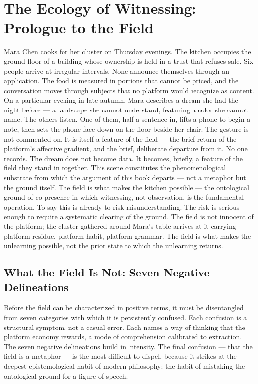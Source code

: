 \chapter{The Ecology of Witnessing: Prologue to the Field}
\label{ch:01}



Mara Chen cooks for her cluster on Thursday evenings. The kitchen occupies the ground floor of a building whose ownership is held in a trust that refuses sale. Six people arrive at irregular intervals. None announce themselves through an application. The food is measured in portions that cannot be priced, and the conversation moves through subjects that no platform would recognize as content. On a particular evening in late autumn, Mara describes a dream she had the night before --- a landscape she cannot understand, featuring a color she cannot name. The others listen. One of them, half a sentence in, lifts a phone to begin a note, then sets the phone face down on the floor beside her chair. The gesture is not commented on. It is itself a feature of the field --- the brief return of the platform's affective gradient, and the brief, deliberate departure from it. No one records. The dream does not become data. It becomes, briefly, a feature of the field they stand in together. This scene constitutes the phenomenological substrate from which the argument of this book departs --- not a metaphor but the ground itself. The field is what makes the kitchen possible --- the ontological ground of co-presence in which witnessing, not observation, is the fundamental operation. To say this is already to risk misunderstanding. The risk is serious enough to require a systematic clearing of the ground. The field is not innocent of the platform; the cluster gathered around Mara's table arrives at it carrying platform-residue, platform-habit, platform-grammar. The field is what makes the unlearning possible, not the prior state to which the unlearning returns.

\section{What the Field Is Not: Seven Negative Delineations}

Before the field can be characterized in positive terms, it must be disentangled from seven categories with which it is persistently confused. Each confusion is a structural symptom, not a casual error. Each names a way of thinking that the platform economy rewards, a mode of comprehension calibrated to extraction. The seven negative delineations build in intensity. The final confusion --- that the field is a metaphor --- is the most difficult to dispel, because it strikes at the deepest epistemological habit of modern philosophy: the habit of mistaking the ontological ground for a figure of speech.


